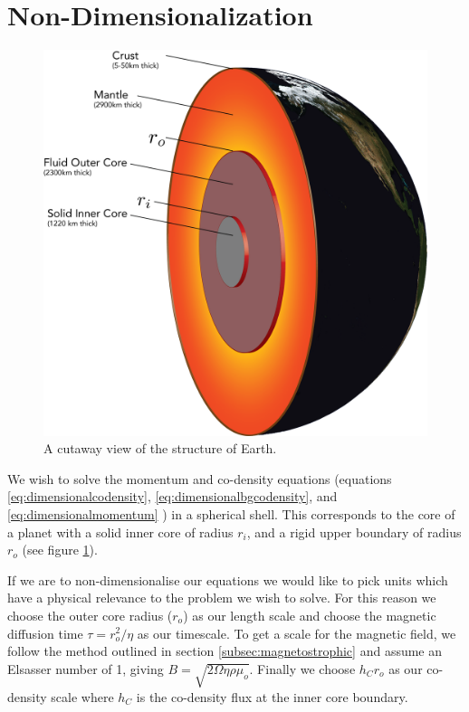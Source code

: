 \section{Non-Dimensionalization}
\begin{figure}
	\centering
	\noindent\includegraphics[width=.6\linewidth]{Chapter2/figures/CutawayEarth.png}
	\caption{A cutaway view of the structure of Earth.}
	\label{fig:CutawayEarth}
\end{figure}
We wish to solve the momentum and co-density equations (equations \ref{eq:dimensionalcodensity}, \ref{eq:dimensionalbgcodensity}, and \ref{eq:dimensionalmomentum} ) in a spherical shell. This corresponds to the core of a planet with a solid inner core of radius $r_i$, and a rigid upper boundary of radius $r_o$ (see figure \ref{fig:CutawayEarth}). 

If we are to non-dimensionalise our equations we would like to pick units which have a physical relevance to the problem we wish to solve. For this reason we choose the outer core radius ($r_{o}$) as our length scale and choose the magnetic diffusion time $\tau=r_{o}^{2}/\eta$ as our timescale. To get a scale for the magnetic field, we follow the method outlined in section \ref{subsec:magnetostrophic} and assume an Elsasser number of 1, giving $B=\sqrt{2\Omega\eta\rho\mu_{o}}$. Finally we choose $h_{C} r_o$ as our co-density scale where $h_{C}$ is the co-density flux at the inner core boundary.


